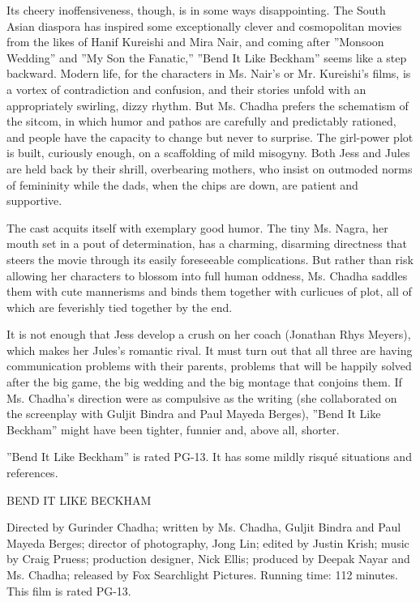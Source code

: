 Its cheery inoffensiveness, though, is in some ways disappointing. The
South Asian diaspora has inspired some exceptionally clever and
cosmopolitan movies from the likes of Hanif Kureishi and Mira Nair, and
coming after ''Monsoon Wedding'' and ''My Son the Fanatic,'' ''Bend It
Like Beckham'' seems like a step backward. Modern life, for the
characters in Ms. Nair's or Mr. Kureishi's films, is a vortex of
contradiction and confusion, and their stories unfold with an
appropriately swirling, dizzy rhythm. But Ms. Chadha prefers the
schematism of the sitcom, in which humor and pathos are carefully and
predictably rationed, and people have the capacity to change but never
to surprise. The girl-power plot is built, curiously enough, on a
scaffolding of mild misogyny. Both Jess and Jules are held back by their
shrill, overbearing mothers, who insist on outmoded norms of femininity
while the dads, when the chips are down, are patient and supportive.

The cast acquits itself with exemplary good humor. The tiny Ms. Nagra,
her mouth set in a pout of determination, has a charming, disarming
directness that steers the movie through its easily foreseeable
complications. But rather than risk allowing her characters to blossom
into full human oddness, Ms. Chadha saddles them with cute mannerisms
and binds them together with curlicues of plot, all of which are
feverishly tied together by the end.

It is not enough that Jess develop a crush on her coach (Jonathan Rhys
Meyers), which makes her Jules's romantic rival. It must turn out that
all three are having communication problems with their parents, problems
that will be happily solved after the big game, the big wedding and the
big montage that conjoins them. If Ms. Chadha's direction were as
compulsive as the writing (she collaborated on the screenplay with
Guljit Bindra and Paul Mayeda Berges), ''Bend It Like Beckham'' might
have been tighter, funnier and, above all, shorter.

''Bend It Like Beckham'' is rated PG-13. It has some mildly risqué
situations and references.

BEND IT LIKE BECKHAM

Directed by Gurinder Chadha; written by Ms. Chadha, Guljit Bindra and
Paul Mayeda Berges; director of photography, Jong Lin; edited by Justin
Krish; music by Craig Pruess; production designer, Nick Ellis; produced
by Deepak Nayar and Ms. Chadha; released by Fox Searchlight Pictures.
Running time: 112 minutes. This film is rated PG-13.

